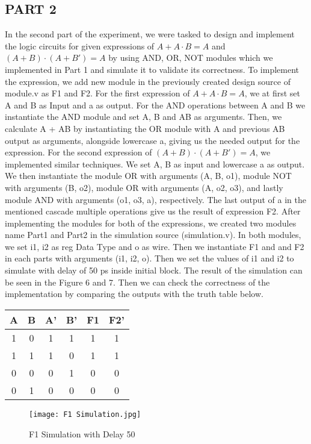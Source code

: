 \documentclass[pdftex,12pt,a4paper]{article}
\begin{document}
\subsection{PART 2}
In the second part of the experiment, we were tasked to design and implement the logic circuits for given expressions of \(A + A · B = A\) and \((A + B) · (A + B') = A\) by using AND, OR, NOT modules which we implemented in Part 1 and simulate it to validate its correctness. To implement the expression, we add new module in the previously created design source of module.v as F1 and F2. For the first expression of \(A + A · B = A\), we at first set A and B as Input and a as output. For the AND operations between A and B we instantiate the AND module and set A, B and AB as arguments.
 Then, we calculate A + AB by instantiating the OR module with A and previous AB output as arguments, alongside lowercase a, giving us the needed output for the expression. For the second expression of \((A + B) · (A + B') = A\), we implemented similar techniques. We set A, B as input and lowercase a as output. We then instantiate the module OR with arguments (A, B, o1), module NOT with arguments (B, o2), module OR with arguments (A, o2, o3), and lastly module AND with arguments (o1, o3, a), respectively. The last output of a in the mentioned cascade multiple operations give us the result of expression F2.
After implementing the modules for both of the expressions, we created two modules name Part1 and Part2 in the simulation source (simulation.v). In both modules, we set i1, i2 as reg Data Type and o as wire. Then we instantiate F1 and and F2 in each parts with arguments (i1, i2, o). Then we set the values of i1 and i2 to simulate with delay of 50 ps inside initial block. The result of the simulation can be seen in the Figure 6 and 7. Then we can check the correctness of the implementation by comparing the outputs with the truth table below.
\begin{center}
 \begin{tabular}{|c|c|c|c|c|c|} 
 \hline
 A & B & A' & B' & F1 & F2' \\ 
 \hline\hline
 1 & 0 & 1 & 1 & 1 & 1 \\ 
 \hline
 1 & 1 & 1 & 0 & 1 & 1 \\
 \hline
 0 & 0 & 0 & 1 & 0 & 0 \\
 \hline
 0 & 1 & 0 & 0 & 0 & 0 \\
 \hline
\end{tabular}
\end{center}

\begin{figure}[ht]
	\centering
	\texttt{[image: F1 Simulation.jpg]}	
	\caption{F1 Simulation with Delay 50}
	\label{fig1}
\end{figure}
\end{document}
